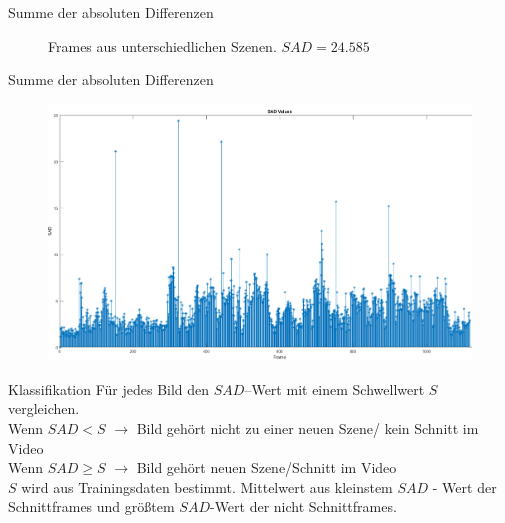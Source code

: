\documentclass[11pt]{beamer}
\begin{document}
\begin{frame}{Summe der absoluten Differenzen}
\begin{figure}
\caption{Frames aus unterschiedlichen Szenen. $SAD = 24.585$} 
\end{figure} 
\end{frame}

\begin{frame}{Summe der absoluten Differenzen}
\begin{figure}
    \includegraphics[scale=0.3]{sadstem.png} 
\end{figure} 
\end{frame}

\begin{frame}{Klassifikation}
Für jedes Bild den $SAD$--Wert mit einem Schwellwert $S$ vergleichen.\\
Wenn $SAD < S$ $\rightarrow$ Bild gehört nicht zu einer neuen Szene/ kein Schnitt im Video\\  
Wenn $SAD \geq S$ $\rightarrow$ Bild gehört  neuen Szene/Schnitt im Video\\  
$S$ wird aus Trainingsdaten bestimmt. Mittelwert aus kleinstem $SAD$ - Wert der Schnittframes und größtem $SAD$-Wert der nicht Schnittframes.
\end{frame}
\end{document}
